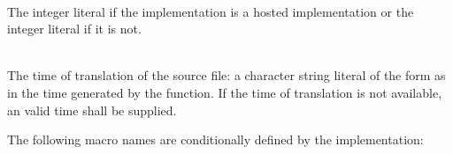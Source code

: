 \begin{description}
%
%
\item {}\\
The integer literal  if the implementation is a hosted
implementation or the integer literal  if it is not.

%
\item {}\\
The time of translation of the source file:
a character string literal of the form
as in the time generated by the
function.
If the time of translation is not available,
an  valid time shall be supplied.
\end{description}

\pnum
The following macro names are conditionally defined by the implementation:

